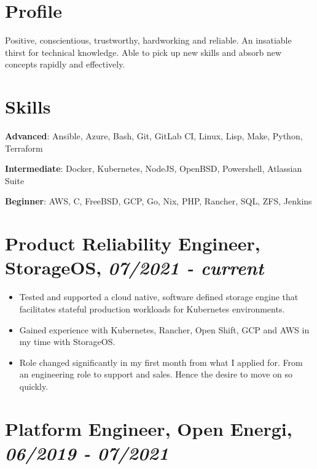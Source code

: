 \documentclass[letterpaper]{article}
\author{Toby Slight}
\date{\today}
\title{}
\begin{document}

\section{Profile}
\label{sec:org79e6958}

Positive, conscientious, trustworthy, hardworking and reliable. An insatiable
thirst for technical knowledge. Able to pick up new skills and absorb new
concepts rapidly and effectively.

\section{Skills}
\label{sec:orge1212d5}

\textbf{Advanced}: Ansible, Azure, Bash, Git, GitLab CI, Linux, Lisp, Make, Python, Terraform

\textbf{Intermediate}: Docker, Kubernetes, NodeJS, OpenBSD, Powershell, Atlassian Suite

\textbf{Beginner}: AWS, C, FreeBSD, GCP, Go, Nix, PHP, Rancher, SQL, ZFS, Jenkins

\section{Product Reliability Engineer, StorageOS, \emph{07/2021 - current}}
\label{sec:orga48ee38}

\begin{itemize}
\item Tested and supported a cloud native, software defined storage engine that
facilitates stateful production workloads for Kubernetes environments.

\item Gained experience with Kubernetes, Rancher, Open Shift, GCP and AWS in
my time with StorageOS.

\item Role changed significantly in my first month from what I applied for. From an
engineering role to support and sales. Hence the desire to move on so
quickly.
\end{itemize}

\section{Platform Engineer, Open Energi, \emph{06/2019 - 07/2021}}
\label{sec:org56a4939}
\end{document}
